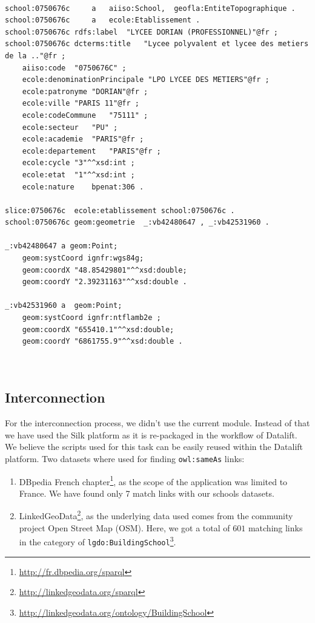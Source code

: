 \begin{lstlisting}

school:0750676c 	a	aiiso:School,  geofla:EntiteTopographique .
school:0750676c 	a	ecole:Etablissement .
school:0750676c	rdfs:label	"LYCEE DORIAN (PROFESSIONNEL)"@fr ;
school:0750676c	dcterms:title	"Lycee polyvalent et lycee des metiers de la .."@fr ;
	aiiso:code	"0750676C" ;
	ecole:denominationPrincipale "LPO LYCEE DES METIERS"@fr ;
	ecole:patronyme	"DORIAN"@fr ;
	ecole:ville	"PARIS 11"@fr ;
	ecole:codeCommune	"75111" ;
	ecole:secteur	"PU" ;
	ecole:academie	"PARIS"@fr ;
	ecole:departement	"PARIS"@fr ;
	ecole:cycle	"3"^^xsd:int ;
	ecole:etat	"1"^^xsd:int ;
	ecole:nature	bpenat:306 .

slice:0750676c	ecole:etablissement	school:0750676c .
school:0750676c	geom:geometrie	_:vb42480647 , _:vb42531960 .		 

_:vb42480647 a geom:Point;
	geom:systCoord ignfr:wgs84g;
	geom:coordX "48.85429801"^^xsd:double;
	geom:coordY "2.39231163"^^xsd:double . 

_:vb42531960 a  geom:Point;
	geom:systCoord ignfr:ntflamb2e ;
	geom:coordX "655410.1"^^xsd:double;
	geom:coordY "6861755.9"^^xsd:double .
     
	
\end{lstlisting}

\subsection{Interconnection}
For the interconnection process, we didn't use the current module. Instead of that we have used the Silk \cite{jentzsch2010silk} platform as it is re-packaged in the workflow of Datalift. We believe the scripts used for this task can be easily reused within the Datalift platform. Two datasets where used for finding \texttt{owl:sameAs} links:
\begin{enumerate}
\item DBpedia French chapter\footnote{\url{http://fr.dbpedia.org/sparql}}, as the scope of the application was limited to France. We have found only 7 match links with our schools datasets.
\item LinkedGeoData\footnote{\url{http://linkedgeodata.org/sparql}}, as the underlying data used comes from the community project Open Street Map (OSM). Here, we got  a total of $601$ matching links in the category of \texttt{lgdo:BuildingSchool}\footnote{\url{http://linkedgeodata.org/ontology/BuildingSchool}}. 
\end{enumerate}


